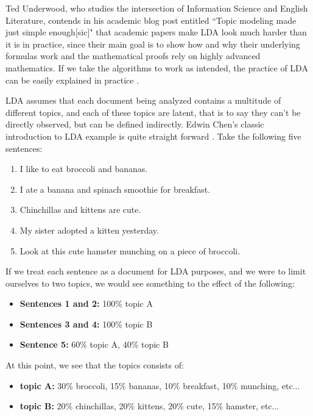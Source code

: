 Ted Underwood, who studies the intersection of Information Science and English Literature, contends in his academic blog post entitled ``Topic modeling made just simple enough[sic]" that academic papers make LDA look much harder than it is in practice, since their main goal is to show how and why their underlying formulas work and the mathematical proofs rely on highly advanced mathematics. If we take the algorithms to work as intended, the practice of LDA can be easily explained in practice \citep{Underwood2012}.

LDA assumes that each document being analyzed contains a multitude of different topics, and each of these topics are latent, that is to say they can't be directly observed, but can be defined indirectly. Edwin Chen's classic introduction to LDA example is quite straight forward \citep{Chen2011}.  Take the following five sentences:

\begin{enumerate}
	\singlespacing 
	\item I like to eat broccoli and bananas.
	\item I ate a banana and spinach smoothie for breakfast.
	\item Chinchillas and kittens are cute.
	\item My sister adopted a kitten yesterday.
	\item Look at this cute hamster munching on a piece of broccoli.
\end{enumerate}

If we treat each sentence as a document for LDA purposes, and we were to limit ourselves to two topics, we would see something to the effect of the following:

\begin{itemize}
	\item \textbf{Sentences 1 and 2:} 100\% topic A
	\item \textbf{Sentences 3 and 4:} 100\% topic B
	\item \textbf{Sentence 5:} 60\% topic A, 40\% topic B
\end{itemize}

At this point, we see that the topics consists of:
\begin{itemize}	
	\item \textbf{topic A:} 30\% broccoli, 15\% bananas, 10\% breakfast, 10\% munching, etc... 
	
	\item \textbf{topic B:} 20\% chinchillas, 20\% kittens, 20\% cute, 15\% hamster, etc...  
\end{itemize}

